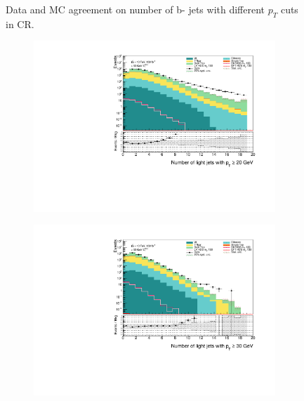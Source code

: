 \documentclass[12pt, a4paper]{book}
\begin{document}
\begin{figure}[!ht]
\begin{subfigure}[b]{0.49\textwidth}
    \end{subfigure}
    \caption{Data and MC agreement on number of b- jets with different $p_T$ cuts in CR.}
\end{figure}

\begin{figure}[!ht]
    \centering
    \begin{subfigure}[b]{0.49\textwidth}
        \centering
        \includegraphics[width=\textwidth]{ljetsPt20.pdf}
    \end{subfigure}
    \hfill\begin{subfigure}[b]{0.49\textwidth}
        \centering
        \includegraphics[width=\textwidth]{ljetsPt30.pdf}
    \end{subfigure}
    \hfill\begin{subfigure}[b]{0.49\textwidth}

\end{subfigure}
\end{figure}
\end{document}
